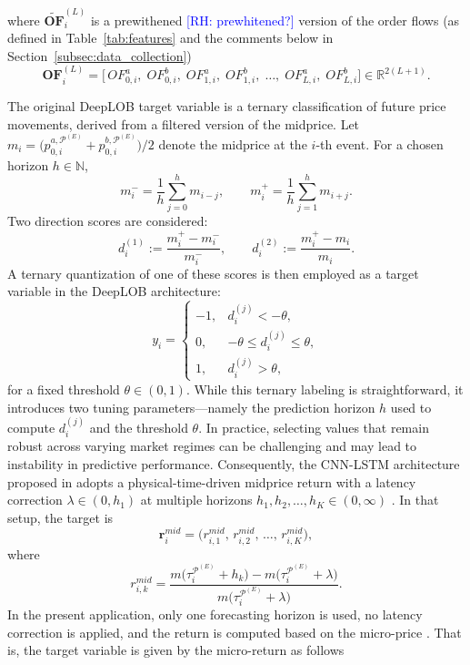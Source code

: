 \documentclass[10pt,a4paper,oneside]{article}
\newcommand{\rh}[1]{\textcolor{blue}{\textsf{[RH: #1]}}}
\begin{document}
where $\widetilde{\mathbf{OF}}^{(L)}_i$ is a prewithened \rh{prewhitened?} version of the order flows (as defined in Table~\ref{tab:features} and the comments below in Section~\ref{subsec:data_collection})
\[
    \mathbf{OF}^{(L)}_i
    =
    \bigl[\,OF^a_{0, i},\;
        OF^b_{0, i},\; OF^a_{1, i},\; OF^b_{1, i},\; \dots,\; OF^a_{L, i},\; OF^b_{L, i}\bigr]
    \in \mathbb{R}^{2(L + 1)}.
\]

The original DeepLOB target variable is a ternary classification of future price movements, derived from a filtered version of the midprice. Let $m_i = \bigl(p^{a, \mathcal{P}^{(E)}}_{0,i} + p^{b, \mathcal{P}^{(E)}}_{0,i}\bigr) / 2$ denote the midprice at the $i$-th event. For a chosen horizon $h \in \mathbb{N}$,
\[
    m_i^- = \frac{1}{h}\sum_{j=0}^{h} m_{i-j},
    \quad\quad
    m_i^+ = \frac{1}{h}\sum_{j=1}^{h} m_{i+j}.
\]
Two direction scores are considered:
\[
    d_i^{(1)} := \frac{m_i^+ - m_i^-}{m_i^-},
    \quad\quad
    d_i^{(2)} := \frac{m_i^+ - m_i}{m_i}.
\]
A ternary quantization of one of these scores is then employed as a target variable in the DeepLOB architecture:
\[
    y_i =
    \begin{cases}
        -1, & d_i^{(j)} < -\theta,              \\[6pt]
        0,  & -\theta \le d_i^{(j)} \le \theta, \\[6pt]
        1,  & d_i^{(j)} > \theta,
    \end{cases}
\]
for a fixed threshold \(\theta \in (0, 1)\). While this ternary labeling is straightforward, it introduces two tuning parameters—namely the prediction horizon \(h\) used to compute \(d_i^{(j)}\) and the threshold \(\theta\). In practice, selecting values that remain robust across varying market regimes can be challenging and may lead to instability in predictive performance. Consequently, the CNN-LSTM architecture proposed in \cite{kolm2023deep} adopts a physical-time-driven midprice return with a latency correction \(\lambda \in (0, h_1)\) at multiple horizons \(h_1, h_2, \dots, h_K \in (0, \infty)\) . In that setup, the target is
\[
    \mathbf{r}^{mid}_i
    =
    \bigl(r^{mid}_{i, 1},\, r^{mid}_{i, 2},\, \dots,\, r^{mid}_{i, K}\bigr),
\]
where
\[
    r^{mid}_{i, k}
    =
    \frac{m\bigl(\tau^{\mathcal{P}^{(E)}}_i + h_k\bigr)
        - m\bigl(\tau^{\mathcal{P}^{(E)}}_i + \lambda\bigr)}
    {m\bigl(\tau^{\mathcal{P}^{(E)}}_i + \lambda\bigr)}.
\]
In the present application, only one forecasting horizon is used, no latency correction is applied, and the return is computed based on the micro-price \cite{gatheral2010zero}. That is, the target variable is given by the micro-return as follows
\end{document}
